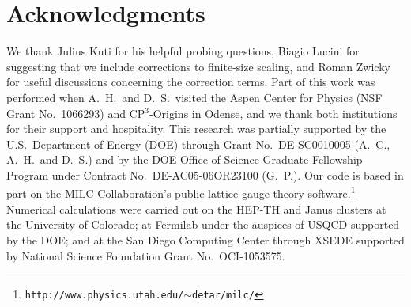 \documentclass[prl, letterpaper, amsmath, amssymb, preprintnumbers, showpacs, superscriptaddress, twocolumn]{revtex4-1}
\begin{document}
\section*{Acknowledgments} %
We thank Julius Kuti for his helpful probing questions, Biagio Lucini for suggesting that we include corrections to finite-size scaling, and Roman Zwicky for useful discussions concerning the correction terms.
Part of this work was performed when A.~H.\ and D.~S.\ visited the Aspen Center for Physics (NSF Grant No.~1066293) and CP$^3$-Origins in Odense, and we thank both institutions for their support and hospitality.
This research was partially supported by the U.S.~Department of Energy (DOE) through Grant No.~DE-SC0010005 (A.~C., A.~H.\ and D.~S.) and by the DOE Office of Science Graduate Fellowship Program under Contract No.~DE-AC05-06OR23100 (G.~P.).
Our code is based in part on the MILC Collaboration's public lattice gauge theory software.\footnote{\texttt{http://www.physics.utah.edu/$\sim$detar/milc/}}
Numerical calculations were carried out on the HEP-TH and Janus clusters at the University of Colorado; at Fermilab under the auspices of USQCD supported by the DOE; and at the San Diego Computing Center through XSEDE supported by National Science Foundation Grant No.~OCI-1053575.





\end{document}
